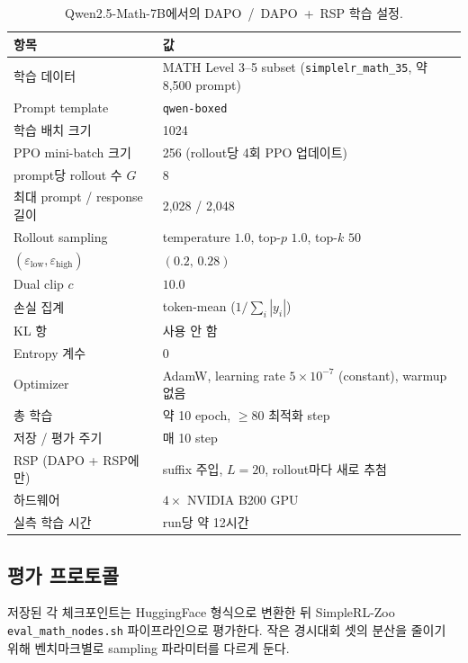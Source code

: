 \begin{table}[H]
\centering
\caption{Qwen2.5-Math-7B에서의 DAPO~/~DAPO~+~RSP 학습 설정.}
\label{tab:dapo_hp}
\footnotesize
\setlength{\tabcolsep}{4pt}
\renewcommand{\arraystretch}{0.9}
\begin{tabular}{ll}
\toprule
\textbf{항목} & \textbf{값} \\
\midrule
학습 데이터 & MATH Level 3--5 subset (\texttt{simplelr\_math\_35}, 약 8{,}500 prompt) \\
Prompt template & \texttt{qwen-boxed} \\
학습 배치 크기 & 1024 \\
PPO mini-batch 크기 & 256 (rollout당 4회 PPO 업데이트) \\
prompt당 rollout 수 $G$ & 8 \\
최대 prompt / response 길이 & 2{,}028 / 2{,}048 \\
Rollout sampling & temperature $1.0$, top-$p$ $1.0$, top-$k$ $50$ \\
\midrule
$(\varepsilon_{\text{low}},\varepsilon_{\text{high}})$ & $(0.2,\,0.28)$ \\
Dual clip $c$ & $10.0$ \\
손실 집계 & token-mean ($1/\sum_i|y_i|$) \\
KL 항 & 사용 안 함 \\
Entropy 계수 & $0$ \\
\midrule
Optimizer & AdamW, learning rate $5\times10^{-7}$ (constant), warmup 없음 \\
총 학습 & 약 10 epoch, $\geq 80$ 최적화 step \\
저장 / 평가 주기 & 매 10 step \\
\midrule
RSP (DAPO + RSP에만) & suffix 주입, $L=20$, rollout마다 새로 추첨 \\
\midrule
하드웨어 & $4 \times$ NVIDIA B200 GPU \\
실측 학습 시간 & run당 약 12시간 \\
\bottomrule
\end{tabular}
\end{table}

\subsection{평가 프로토콜}

저장된 각 체크포인트는 HuggingFace 형식으로 변환한 뒤 SimpleRL-Zoo \texttt{eval\_math\_nodes.sh} 파이프라인으로 평가한다. 작은 경시대회 셋의 분산을 줄이기 위해 벤치마크별로 sampling 파라미터를 다르게 둔다.

